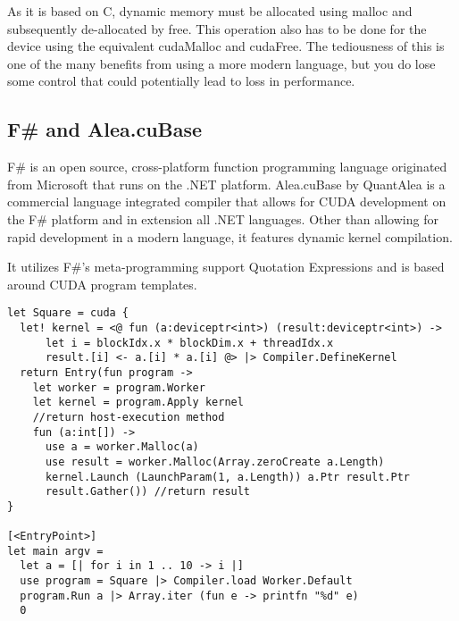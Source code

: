 As it is based on C, dynamic memory must be allocated using malloc and subsequently de-allocated by free.
This operation also has to be done for the device using the equivalent cudaMalloc and cudaFree.
The tediousness of this is one of the many benefits from using a more modern language, but you do lose some control that could potentially lead to loss in performance.

\subsection{F\# and Alea.cuBase}
F\#\cite{fsharp} is an open source, cross-platform function programming language originated from Microsoft that runs on the .NET platform.
Alea.cuBase by QuantAlea\cite{quantalea} is a commercial language integrated compiler that allows for CUDA development on the F\# platform and in extension all .NET languages.
Other than allowing for rapid development in a modern language, it features dynamic kernel compilation.

It utilizes F\#'s meta-programming support Quotation Expressions\cite{ms:quotations} and is based around CUDA program templates.

\begin{lstlisting}[caption=Alea.cuBase square kernel, label=cubase_add]
let Square = cuda {
  let! kernel = <@ fun (a:deviceptr<int>) (result:deviceptr<int>) ->
      let i = blockIdx.x * blockDim.x + threadIdx.x
      result.[i] <- a.[i] * a.[i] @> |> Compiler.DefineKernel
  return Entry(fun program ->
    let worker = program.Worker
    let kernel = program.Apply kernel
    //return host-execution method
    fun (a:int[]) ->
      use a = worker.Malloc(a)
      use result = worker.Malloc(Array.zeroCreate a.Length)
      kernel.Launch (LaunchParam(1, a.Length)) a.Ptr result.Ptr
      result.Gather()) //return result
}

[<EntryPoint>]
let main argv = 
  let a = [| for i in 1 .. 10 -> i |]
  use program = Square |> Compiler.load Worker.Default
  program.Run a |> Array.iter (fun e -> printfn "%d" e)
  0
\end{lstlisting}